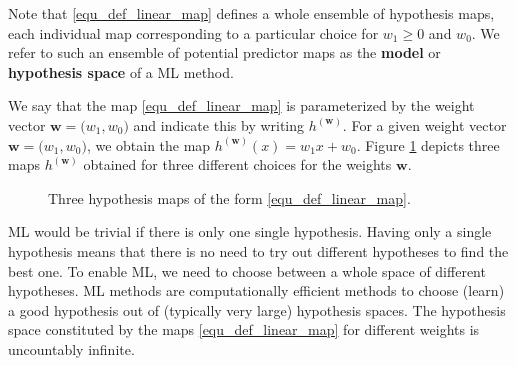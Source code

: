 \documentclass[12pt]{report}
\begin{document}
Note that \eqref{equ_def_linear_map} defines a whole ensemble of hypothesis maps, 
each individual map corresponding to a particular choice for $w_{1} \geq 0$ and $w_{0}$. 
We refer to such an ensemble of potential predictor maps as the {\bf model} or 
{\bf hypothesis space} of a ML method. 

We say that the map \eqref{equ_def_linear_map} is parameterized by the weight vector 
$\mathbf{w}= \big(w_{1},w_{0}\big)$ and indicate this by writing $h^{(\mathbf{w})}$. 
For a given weight vector $\mathbf{w}= \big(w_{1},w_{0}\big)$, we obtain the map 
$h^{(\mathbf{w})}(x) = w_{1}x +w_{0}$. 
Figure \ref{fig_three_maps_example} depicts three maps $h^{(\mathbf{w})}$ 
obtained for three different choices for the weights $\mathbf{w}$.  
\begin{figure}[htbp]
	\begin{center}
		\vspace*{-4mm}
	\end{center}
	\caption{Three hypothesis maps of the form \eqref{equ_def_linear_map}.}
	\label{fig_three_maps_example}
\end{figure}

ML would be trivial if there is only one single hypothesis. Having 
only a single hypothesis means that there is no need to try out 
different hypotheses to find the best one. To enable ML, we need 
to choose between a whole space of different hypotheses. ML 
methods are computationally efficient methods to choose (learn) 
a good hypothesis out of (typically very large) hypothesis spaces. 
The hypothesis space constituted by the maps \eqref{equ_def_linear_map} 
for different weights is uncountably infinite. 
\end{document}
